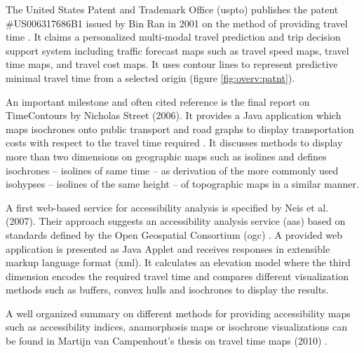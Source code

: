     The United States Patent and Trademark Office (\acrshort{uspto}) publishes
    the patent \#US006317686B1 issued by Bin Ran in 2001 on the method of
    providing travel time \cite{ran2001method}. It claims a personalized
    multi-modal travel prediction and trip decision support system including
    traffic forecast maps such as travel speed maps, travel time maps, and
    travel cost maps. It uses contour lines to represent predictive minimal
    travel time from a selected origin (figure \ref{fig:overv:patnt}).\par


    An important milestone and often cited reference is the final report on
    TimeContours by Nicholas Street (2006). It provides a Java application which
    maps isochrones onto public transport and road graphs to display
    transportation costs with respect to the travel time required
    \cite{street2006timecontours}. It discusses methods to display more than two
    dimensions on geographic maps such as isolines and defines isochrones --
    isolines of same time -- as derivation of the more commonly used isohypses
    -- isolines of the same height -- of topographic maps in a similar
    manner.\par


    A first web-based service for accessibility analysis is specified by
    Neis et al. (2007). Their approach suggests an accessibility analysis
    service (\acrshort{aas}) based on standards defined by the Open Geospatial
    Consortium (\acrshort{ogc}) \cite{neis2007webbasierte}. A provided web
    application is presented as Java Applet and receives responses in extensible
    markup language format (\acrshort{xml}). It calculates an elevation model
    where the third dimension encodes the required travel time and compares
    different visualization methods such as buffers, convex hulls and isochrones
    to display the results.\par

    A well organized summary on different methods for providing accessibility
    maps such as accessibility indices, anamorphosis maps or isochrone
    visualizations can be found in Martijn van Campenhout's thesis on travel
    time maps (2010) \cite{van2010travel}.\par

